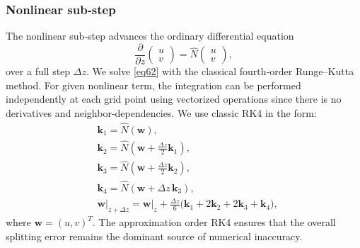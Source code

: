 \documentclass{article}
\begin{document}
            \subsubsection{Nonlinear sub‑step}
                The nonlinear sub‑step advances the ordinary differential equation
                \begin{equation} \label{eq62}
                    \frac{\partial}{\partial z}\begin{pmatrix}u\\v\end{pmatrix}
                    = \hat N\begin{pmatrix}u\\v\end{pmatrix},
                \end{equation}
                over a full step $\Delta z$.  We solve \eqref{eq62} with the classical fourth‑order Runge–Kutta method.
                For given nonlinear term, the integration can be performed independently
                at each grid point using vectorized operations since there is no derivatives and neighbor-dependencies. We use classic RK4 in the form:
                \begin{align}
                    &\mathbf{k}_1 = \hat N(\mathbf{w}), \nonumber\\
                    &\mathbf{k}_2 = \hat N(\mathbf{w} + \tfrac{\Delta z}{2}\mathbf{k}_1), \nonumber\\
                    &\mathbf{k}_3 = \hat N(\mathbf{w} + \tfrac{\Delta z}{2}\mathbf{k}_2), \nonumber\\
                    &\mathbf{k}_4 = \hat N(\mathbf{w} + \Delta z\,\mathbf{k}_3), \nonumber\\
                    &\mathbf{w}\Big| _{z+\Delta z} = \mathbf{w}\Big| _{z} + \frac{\Delta z}{6}\bigl(\mathbf{k}_1+2\mathbf{k}_2+2\mathbf{k}_3+\mathbf{k}_4\bigr), \nonumber
                \end{align}
                where $\mathbf{w}=(u,v)^T$. The approximation order RK4 ensures that the overall splitting error remains the dominant source of numerical inaccuracy.
\end{document}
